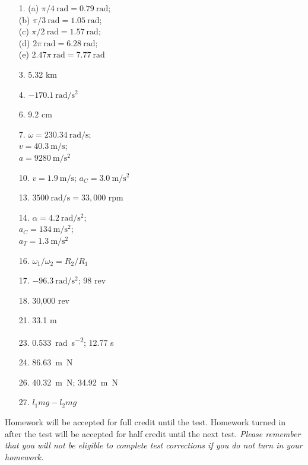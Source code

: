 \documentclass[10pt]{exam}
\begin{document}
\begin{multicols}{3}

  \begin{itemize}[noitemsep]
    \item[1.]  
      (a) $\pi/4~\text{rad} = 0.79~\text{rad} $;  \\
      (b) $\pi/3~\text{rad} = 1.05~\text{rad}$; \\
      (c) $\pi/2~\text{rad} = 1.57~\text{rad}$; \\
      (d) $2\pi~\text{rad} = 6.28~\text{rad}$; \\
      (e) $2.47\pi~\text{rad} = 7.77~\text{rad}$
    \item[3.]  5.32 km
    \item[4.]  $\SI{-170.1}{\radian\per\second^2}$
    \item[6.]  9.2 cm
    \item[7.]  
      $\omega = \SI{230.34}{\radian\per\second}$; \\
      $v = \SI{40.3}{\meter\per\second}$;\\  
      $a = \SI{9280}{\meter\per\second^2}$
    \item[10.]
      $v = \SI{1.9}{\meter\per\second}$;
      $a_C = \SI{3.0}{\meter\per\second^2}$
    \item[13.]  
      $\SI{3500}{\radian\per\second} = 33,000$ rpm
    \item[14.]  
      $\alpha = \SI{4.2}{\radian\per\second^2}$;\\ 
      $a_C = \SI{134}{\meter\per\second^2}$;\\  
      $a_T = \SI{1.3}{\meter\per\second^2}$
    \item[16.]  $\omega_1/\omega_2=R_2/R_1$
    \item[17.]  
      $\SI{-96.3}{\radian\per\second^2}$; 98 rev
    \item[18.]  30,000 rev
    \item[21.]  33.1 m
    \item[23.]  
      \SI{0.533}{\radian\per\second^2}; 12.77 s
    \item[24.]  \SI{86.63}{\meter\newton}
    \item[26.]  
      \SI{40.32}{\meter\newton}; 
      \SI{34.92}{\meter\newton}
    \item[27.]  $l_1 mg-l_2 mg$
  \end{itemize}
  
\end{multicols}

\noindent
{\footnotesize Homework will be accepted for full credit until the test.  Homework turned in after the test will be accepted for half credit until the next test.  \emph{Please remember that you will not be eligible to complete test corrections if you do not turn in your homework.}}
\end{document}
